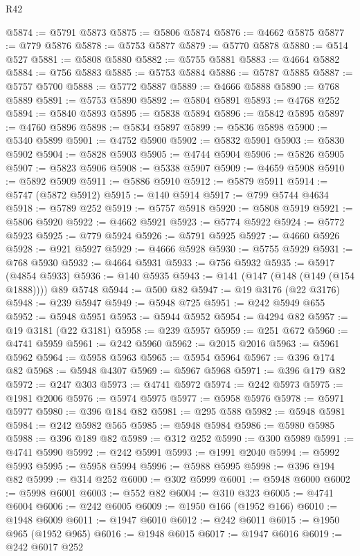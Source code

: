 \begin{lexlean}{R42}
\begin{coremodule}
{@5874 := @5791 @5873
@5875 := @5806 @5874
@5876 := @4662 @5875
@5877 := @779 @5876
@5878 := @5753 @5877
@5879 := @5770 @5878
@5880 := @514 @527
@5881 := @5808 @5880
@5882 := @5755 @5881
@5883 := @4664 @5882
@5884 := @756 @5883
@5885 := @5753 @5884
@5886 := @5787 @5885
@5887 := @5757 @5700
@5888 := @5772 @5887
@5889 := @4666 @5888
@5890 := @768 @5889
@5891 := @5753 @5890
@5892 := @5804 @5891
@5893 := @4768 @252
@5894 := @5840 @5893
@5895 := @5838 @5894
@5896 := @5842 @5895
@5897 := @4760 @5896
@5898 := @5834 @5897
@5899 := @5836 @5898
@5900 := @5340 @5899
@5901 := @4752 @5900
@5902 := @5832 @5901
@5903 := @5830 @5902
@5904 := @5828 @5903
@5905 := @4744 @5904
@5906 := @5826 @5905
@5907 := @5823 @5906
@5908 := @5338 @5907
@5909 := @4659 @5908
@5910 := @5892 @5909
@5911 := @5886 @5910
@5912 := @5879 @5911
@5914 := @5747 (@5872 @5912)
@5915 := @140 @5914
@5917 := @799 @5744 @4634
@5918 := @5789 @252
@5919 := @5757 @5918
@5920 := @5808 @5919
@5921 := @5806 @5920
@5922 := @4662 @5921
@5923 := @5774 @5922
@5924 := @5772 @5923
@5925 := @779 @5924
@5926 := @5791 @5925
@5927 := @4660 @5926
@5928 := @921 @5927
@5929 := @4666 @5928
@5930 := @5755 @5929
@5931 := @768 @5930
@5932 := @4664 @5931
@5933 := @756 @5932
@5935 := @5917 (@4854 @5933)
@5936 := @140 @5935
@5943 := @141 (@147 (@148 (@149 (@154 @1888)))) @89 @5748
@5944 := @500 @82
@5947 := @19 @3176 (@22 @3176)
@5948 := @239 @5947
@5949 := @5948 @725
@5951 := @242 @5949 @655
@5952 := @5948 @5951
@5953 := @5944 @5952
@5954 := @4294 @82
@5957 := @19 @3181 (@22 @3181)
@5958 := @239 @5957
@5959 := @251 @672
@5960 := @4741 @5959
@5961 := @242 @5960
@5962 := @2015 @2016
@5963 := @5961 @5962
@5964 := @5958 @5963
@5965 := @5954 @5964
@5967 := @396 @174 @82
@5968 := @5948 @4307
@5969 := @5967 @5968
@5971 := @396 @179 @82
@5972 := @247 @303
@5973 := @4741 @5972
@5974 := @242 @5973
@5975 := @1981 @2006
@5976 := @5974 @5975
@5977 := @5958 @5976
@5978 := @5971 @5977
@5980 := @396 @184 @82
@5981 := @295 @588
@5982 := @5948 @5981
@5984 := @242 @5982 @565
@5985 := @5948 @5984
@5986 := @5980 @5985
@5988 := @396 @189 @82
@5989 := @312 @252
@5990 := @300 @5989
@5991 := @4741 @5990
@5992 := @242 @5991
@5993 := @1991 @2040
@5994 := @5992 @5993
@5995 := @5958 @5994
@5996 := @5988 @5995
@5998 := @396 @194 @82
@5999 := @314 @252
@6000 := @302 @5999
@6001 := @5948 @6000
@6002 := @5998 @6001
@6003 := @552 @82
@6004 := @310 @323
@6005 := @4741 @6004
@6006 := @242 @6005
@6009 := @1950 @166 (@1952 @166)
@6010 := @1948 @6009
@6011 := @1947 @6010
@6012 := @242 @6011
@6015 := @1950 @965 (@1952 @965)
@6016 := @1948 @6015
@6017 := @1947 @6016
@6019 := @242 @6017 @252
}
\end{coremodule}
\end{lexlean}

